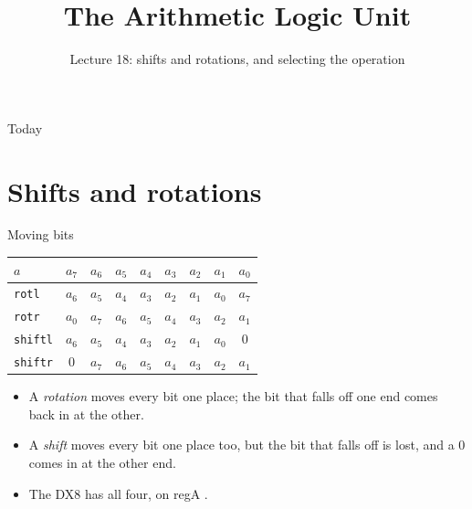 \documentclass[10pt]{wosm-slides}
\title[Lecture 18 \textperiodcentered\ The Arithmetic Logic Unit]{The Arithmetic
  Logic Unit}
\subtitle{Lecture 18: shifts and rotations, and selecting the operation}
\newcommand*\moved[1]{\textcolor{wosm-brick}{#1}}
\begin{document}
\maketitle

\begin{frame}{Today}
  \tableofcontents
\end{frame}

\section{Shifts and rotations}

\begin{frame}{Moving bits}
  \begin{center}
    \begin{tabular}{@{}l*{8}{c}@{}}
      \toprule
      $a$ & $a_7$ & $a_6$ & $a_5$ & $a_4$ & $a_3$ & $a_2$ & $a_1$ & $a_0$ \\
      \midrule
      \texttt{rotl}   & $a_6$ & $a_5$ & $a_4$ & $a_3$ & $a_2$ & $a_1$ & $a_0$ & \moved{$a_7$} \\
      \texttt{rotr}   & \moved{$a_0$} & $a_7$ & $a_6$ & $a_5$ & $a_4$ & $a_3$ & $a_2$ & $a_1$ \\
      \texttt{shiftl} & $a_6$ & $a_5$ & $a_4$ & $a_3$ & $a_2$ & $a_1$ & $a_0$ & \moved{0} \\
      \texttt{shiftr} & \moved{0} & $a_7$ & $a_6$ & $a_5$ & $a_4$ & $a_3$ & $a_2$ & $a_1$ \\
      \bottomrule
    \end{tabular}
  \end{center}

  \begin{itemize}
    \item A \emph{rotation} moves every bit one place; the bit that falls off one end
      comes back in at the other.
    \item A \emph{shift} moves every bit one place too, but the bit that falls off is
      lost, and a 0 comes in at the other end.
    \item The DX8 has all four, on regA .
  \end{itemize}
\end{frame}
\end{document}

